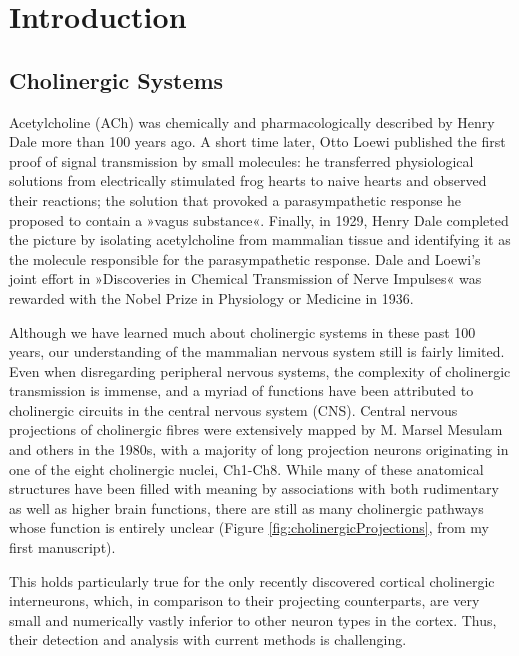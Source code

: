 \chapter{Introduction}
\label{introduction}
\section{Cholinergic Systems}
 Acetylcholine (ACh) was chemically and pharmacologically described by Henry Dale more than 100 years ago\cite{Dale1914}. A short time later, Otto Loewi published the first proof of signal transmission by small molecules: he transferred physiological solutions from electrically stimulated frog hearts to naive hearts and observed their reactions; the solution that provoked a parasympathetic response he proposed to contain a »vagus substance«\cite{Loewi1921}. Finally, in 1929, Henry Dale completed the picture by isolating acetylcholine from mammalian tissue and identifying it as the molecule responsible for the parasympathetic response\cite{Dale1929}. Dale and Loewi's joint effort in »Discoveries in Chemical Transmission of Nerve Impulses« was rewarded with the Nobel Prize in Physiology or Medicine in 1936.

Although we have learned much about cholinergic systems in these past 100 years, our understanding of the mammalian nervous system still is fairly limited. Even when disregarding peripheral nervous systems, the complexity of cholinergic transmission is immense, and a myriad of functions have been attributed to cholinergic circuits in the central nervous system (CNS). Central nervous projections of cholinergic fibres were extensively mapped by M. Marsel Mesulam and others in the 1980s\cite{Mesulam1984}, with a majority of long projection neurons originating in one of the eight cholinergic nuclei, Ch1-Ch8. While many of these anatomical structures have been filled with meaning by associations with both rudimentary as well as higher brain functions, there are still as many cholinergic pathways whose function is entirely unclear (Figure \ref{fig:cholinergicProjections}, from my first manuscript\cite{Lobentanzer2019}).

This holds particularly true for the only recently discovered cortical cholinergic interneurons, which, in comparison to their projecting counterparts, are very small and numerically vastly inferior to other neuron types in the cortex. Thus, their detection and analysis with current methods is challenging. 

